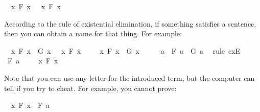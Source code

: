 \begin{isabellebody}
\begin{isamarkuptext}
\end{isamarkuptext}\isamarkuptrue%
\isamarkupfalse%
\ {\isachardoublequoteopen}{\isacharparenleft}{\isasymforall}\ x{\isachardot}\ F\ x{\isacharparenright}\ {\isasymlongrightarrow}\ {\isacharparenleft}{\isasymexists}\ x{\isachardot}\ F\ x{\isacharparenright}{\isachardoublequoteclose}%
\isadelimproof
\ %
\endisadelimproof
%
\isatagproof
{}\isamarkupfalse%
%
\endisatagproof
{\isafoldproof}%
%
\isadelimproof
%
\endisadelimproof
%
\isamarkuptrue%
%
\begin{isamarkuptext}%
According to the rule of existential elimination, if something satisfies a sentence, then
you can obtain a name for that thing. For example:%
\end{isamarkuptext}\isamarkuptrue%
\isamarkupfalse%
\ {\isachardoublequoteopen}{\isacharparenleft}{\isasymexists}\ x{\isachardot}\ F\ x\ {\isasymand}\ G\ x{\isacharparenright}\ {\isasymlongrightarrow}\ {\isacharparenleft}{\isasymexists}\ x{\isachardot}\ F\ x{\isacharparenright}{\isachardoublequoteclose}\isanewline
%
\isadelimproof
%
\endisadelimproof
%
\isatagproof
{}\isamarkupfalse%
\isanewline
\ \ \isamarkupfalse%
\ {\isachardoublequoteopen}{\isasymexists}\ x{\isachardot}\ F\ x\ {\isasymand}\ G\ x{\isachardoublequoteclose}\isanewline
\ \ \isamarkupfalse%
\ \isamarkupfalse%
\ a\ \ {\isachardoublequoteopen}F\ a\ {\isasymand}\ G\ a{\isachardoublequoteclose}\ \isamarkupfalse%
\ {\isacharparenleft}rule\ exE{\isacharparenright}\isanewline
\ \ \isamarkupfalse%
\ {\isachardoublequoteopen}F\ a{\isachardoublequoteclose}\isacommand{{\isachardot}{\isachardot}}\isamarkupfalse%
\isanewline
\ \ \isamarkupfalse%
\ {\isachardoublequoteopen}{\isasymexists}\ x{\isachardot}\ F\ x{\isachardoublequoteclose}\isacommand{{\isachardot}{\isachardot}}\isamarkupfalse%
\isanewline
{}\isamarkupfalse%
%
\endisatagproof
{\isafoldproof}%
%
\isadelimproof
%
\endisadelimproof
%
\begin{isamarkuptext}%
Note that you can use any letter for the introduced term, but the computer can tell if you
try to cheat. For example, you cannot prove:%
\end{isamarkuptext}\isamarkuptrue%
\isamarkupfalse%
\ {\isachardoublequoteopen}{\isacharparenleft}{\isasymexists}\ x{\isachardot}\ F\ x{\isacharparenright}\ {\isasymlongrightarrow}\ F\ a{\isachardoublequoteclose}%

\end{isabellebody}
